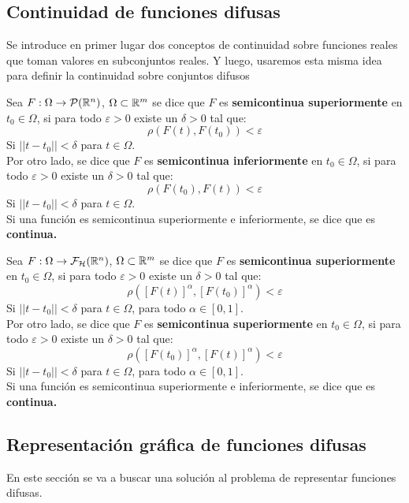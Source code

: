   \fi

  \subsection{Continuidad de funciones difusas}
  Se introduce en primer lugar dos conceptos de continuidad sobre funciones reales que toman valores en subconjuntos reales. Y luego, usaremos esta misma idea para definir la continuidad sobre conjuntos difusos

  \begin{definicion}
    \label{def:funcioncontinua}
    Sea $F : \Omega \rightarrow \mathcal{P}(\mathbb R^n)$, $\Omega \subset \mathbb R^m$ se dice que $F$ es \textbf{semicontinua superiormente} en $t_0 \in \Omega$, si para todo $\varepsilon>0$ existe un $\delta>0$ tal que:
    \[
    \rho(F(t), F(t_0))<\varepsilon
    \]
    Si $||t-t_0||<\delta$ para $t \in \Omega$. \\
    Por otro lado, se dice que $F$  es \textbf{semicontinua inferiormente} en $t_0 \in \Omega$, si para todo $\varepsilon>0$ existe un $\delta>0$ tal que:
    \[
    \rho(F(t_0), F(t))<\varepsilon
    \]
    Si $||t-t_0||<\delta$ para $t \in \Omega$. \\
    Si una función es semicontinua superiormente e inferiormente, se dice que es \textbf{continua.}
  \end{definicion}

  \begin{definicion}
    Sea $F : \Omega \rightarrow \mathcal{F}_\mathcal{H}(\mathbb R^n)$, $\Omega \subset \mathbb R^m$ se dice que $F$ es \textbf{semicontinua superiormente} en $t_0 \in \Omega$, si para todo $\varepsilon>0$ existe un $\delta>0$ tal que:
    \[
    \rho([F(t)]^\alpha, [F(t_0)]^\alpha)<\varepsilon
    \]
    Si $||t-t_0||<\delta$ para $t \in \Omega$, para todo $\alpha \in [0, 1]$. \\
    Por otro lado, se dice que $F$ es \textbf{semicontinua superiormente} en $t_0 \in \Omega$, si para todo $\varepsilon>0$ existe un $\delta>0$ tal que:
    \[
    \rho([F(t_0)]^\alpha, [F(t)]^\alpha)<\varepsilon
    \]
    Si $||t-t_0||<\delta$ para $t \in \Omega$, para todo $\alpha \in [0, 1]$. \\
    Si una función es semicontinua superiormente e inferiormente, se dice que es \textbf{continua.}
  \end{definicion}

  \iffalse
  \subsection{Representación gráfica de funciones difusas}
  En este sección se va a buscar una solución al problema de representar funciones difusas.

